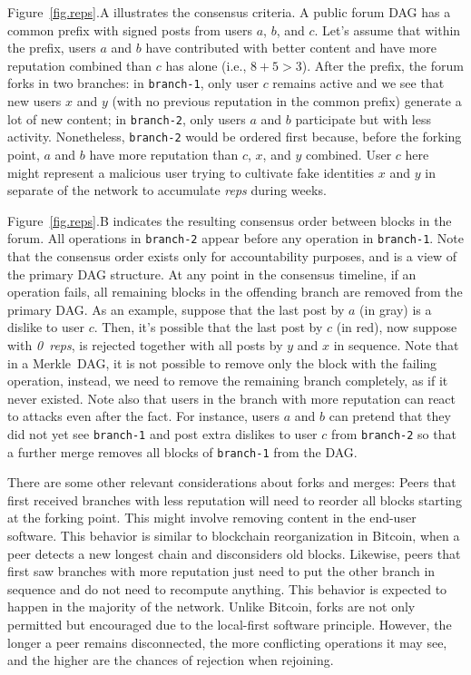\documentclass[10pt,journal,compsoc]{IEEEtran}
\newcommand{\reps}     {\emph{reps}\xspace}
\newcommand{\nreps}[1] {\emph{#1~reps\xspace}}
\newcommand{\code}[1]  {\texttt{\footnotesize{#1}}}
\begin{document}
Figure~\ref{fig.reps}.A illustrates the consensus criteria.
A public forum DAG has a common prefix with signed posts from users $a$, $b$,
and $c$.
Let's assume that within the prefix, users $a$ and $b$ have contributed with
better content and have more reputation combined than $c$ has alone (i.e.,
$8+5>3$).
%
After the prefix, the forum forks in two branches:
in \code{branch-1}, only user $c$ remains active and we see that new users $x$
and $y$ (with no previous reputation in the common prefix) generate a lot of
new content;
in \code{branch-2}, only users $a$ and $b$ participate but with less activity.
Nonetheless, \code{branch-2} would be ordered first because, before the forking
point, $a$ and $b$ have more reputation than $c$, $x$, and $y$ combined.
%
User $c$ here might represent a malicious user trying to cultivate fake
identities $x$ and $y$ in separate of the network to accumulate \reps during
weeks.

Figure~\ref{fig.reps}.B indicates the resulting consensus order between blocks
in the forum.
All operations in \code{branch-2} appear before any operation in
\code{branch-1}.
Note that the consensus order exists only for accountability purposes, and is
a view of the primary DAG structure.
At any point in the consensus timeline, if an operation fails, all remaining
blocks in the offending branch are removed from the primary DAG.
As an example, suppose that the last post by $a$ (in gray) is a dislike to user
$c$.
Then, it's possible that the last post by $c$ (in red), now suppose with
\nreps{0}, is rejected together with all posts by $y$ and $x$ in sequence.
%
Note that in a Merkle~DAG, it is not possible to remove only the block with the
failing operation, instead, we need to remove the remaining branch completely,
as if it never existed.
%
Note also that users in the branch with more reputation can react to attacks
even after the fact.
For instance, users $a$ and $b$ can pretend that they did not yet see
\code{branch-1} and post extra dislikes to user $c$ from \code{branch-2} so
that a further merge removes all blocks of \code{branch-1} from the DAG.

There are some other relevant considerations about forks and merges:
%
Peers that first received branches with less reputation will need to reorder
all blocks starting at the forking point.
This might involve removing content in the end-user software.
This behavior is similar to blockchain reorganization in Bitcoin, when a peer
detects a new longest chain and disconsiders old blocks.
%
Likewise, peers that first saw branches with more reputation just need to put
the other branch in sequence and do not need to recompute anything.
This behavior is expected to happen in the majority of the network.
%
Unlike Bitcoin, forks are not only permitted but encouraged due to the
local-first software principle.
However, the longer a peer remains disconnected, the more conflicting
operations it may see, and the higher are the chances of rejection when
rejoining.
\end{document}
